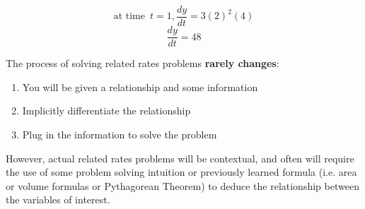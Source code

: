 \documentclass[11pt]{article}
\begin{document}
\[ \textrm{at time} \enspace t=1, \frac{dy}{dt} = 3(2)^2(4) \]
\[ \frac{dy}{dt} = 48 \]

The process of solving related rates problems \textbf{rarely changes}: 

\begin{enumerate}
    \item You will be given a relationship and some information
    \item Implicitly differentiate the relationship 
    \item Plug in the information to solve the problem
\end{enumerate}

However, actual related rates problems will be contextual, and often will require the use of some problem solving intuition or previously learned formula (i.e. area or volume formulas or Pythagorean Theorem) to deduce the relationship between the variables of interest.
\end{document}
